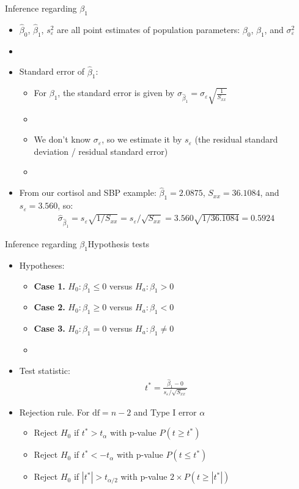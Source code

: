 \documentclass[xcolor=dvipsnames]{beamer}
\begin{document}
\begin{frame}{Inference regarding $\beta_1$}
	\begin{itemize}
		\item $\hat{\beta}_0$, $\hat{\beta}_1$, $s^2_{\varepsilon}$ are all point estimates of population parameters: $\beta_0$, $\beta_1$, and $\sigma^2_{\varepsilon}$
		\item[]
		\item Standard error of $\hat{\beta}_1$:
		\begin{itemize}
			\item For $\beta_1$, the standard error is given by $\sigma_{\hat{\beta}_1} = \sigma_{\varepsilon} \sqrt{\frac{1}{S_{xx}}}$
			\item[]
			\item We don't know $\sigma_{\varepsilon}$, so we estimate it by $s_{\varepsilon}$ (the residual standard deviation / residual standard error)
			\item[]
		\end{itemize}
	\item From our cortisol and SBP example: $\hat{\beta}_1 = 2.0875$, $S_{xx} = 36.1084$, and $s_{\varepsilon}=3.560$, so:
	\begin{gather*}
		\hat{\sigma}_{\hat{\beta}_1} = s_{\varepsilon} \sqrt{1/S_{xx}} = {s_{\varepsilon} / \sqrt{S_{xx}}}= 3.560 \sqrt{1/36.1084} = 0.5924
	\end{gather*}
	\end{itemize}
\end{frame}

\begin{frame}{Inference regarding $\beta_1$}{Hypothesis tests}
	\begin{itemize}
		\item Hypotheses:
		\begin{itemize}
			\item \textbf{Case 1.} $H_0: \beta_1 \leq 0$ versus $H_a: \beta_1 > 0$
			\item \textbf{Case 2.} $H_0: \beta_1 \geq 0$ versus $H_a: \beta_1 < 0$
			\item \textbf{Case 3.} $H_0: \beta_1 = 0$ versus $H_a: \beta_1 \neq 0$
			\item[]
		\end{itemize}
	\item Test statistic:
	\begin{gather*}
		t^*=\frac{\hat{\beta}_1-0}{s_{\varepsilon} / \sqrt{S_{xx}}}
	\end{gather*}
	\item Rejection rule. For $\text{df} = n-2$ and Type I error $\alpha$
	\begin{itemize}
		\item Reject $H_0$ if $t^* > t_{\alpha}$ with p-value $P(t \geq t^*)$
		\item Reject $H_0$ if $t^* < -t_{\alpha}$ with p-value $P(t \leq t^*)$
		\item Reject $H_0$ if $|t^*| > t_{\alpha / 2}$ with p-value $2\times P(t \geq |t^*|)$
	\end{itemize}
	\end{itemize}
\end{frame}
\end{document}
